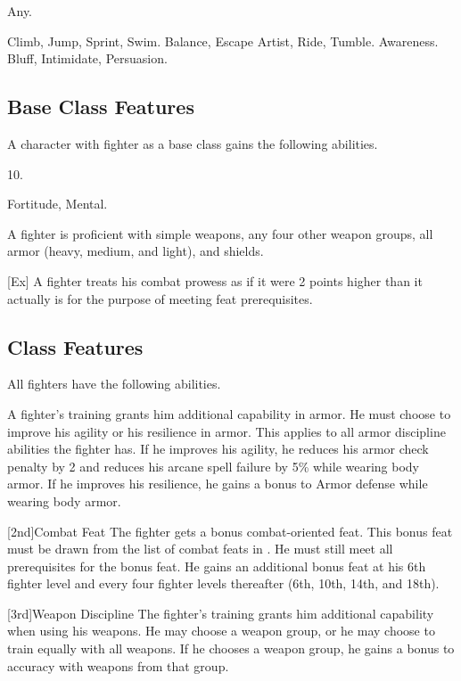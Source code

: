 
 Any.

 Climb, Jump, Sprint, Swim.
 Balance, Escape Artist, Ride, Tumble.
 Awareness.
 Bluff, Intimidate, Persuasion.

\subsection{Base Class Features}
A character with fighter as a base class gains the following abilities.

 10.

  Fortitude,  Mental.

 A fighter is proficient with simple weapons, any four other weapon groups,  all armor (heavy, medium, and light), and shields.

[Ex]
A fighter treats his combat prowess as if it were 2 points higher than it actually is for the purpose of meeting feat prerequisites.

\subsection{Class Features}
All fighters have the following abilities.

A fighter's training grants him additional capability in armor.
He must choose to improve his agility or his resilience in armor.
This applies to all armor discipline abilities the fighter has.
If he improves his agility, he reduces his armor check penalty by 2 and reduces his arcane spell failure by 5\% while wearing body armor.
If he improves his resilience, he gains a  bonus to Armor defense while wearing body armor.

[2nd]{Combat Feat}
The fighter gets a bonus combat-oriented feat.
This bonus feat must be drawn from the list of combat feats in .
He must still meet all prerequisites for the bonus feat.
He gains an additional bonus feat at his 6th fighter level and every four fighter levels thereafter (6th, 10th, 14th, and 18th).

[3rd]{Weapon Discipline}
The fighter's training grants him additional capability when using his weapons.
He may choose a weapon group, or he may choose to train equally with all weapons.
If he chooses a weapon group, he gains a  bonus to accuracy with weapons from that group.

